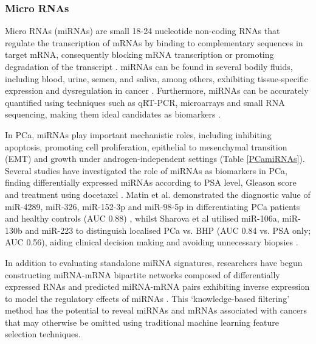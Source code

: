 \subsubsection{Micro RNAs}
Micro RNAs (miRNAs) are small 18-24 nucleotide non-coding RNAs that regulate the transcription of mRNAs by binding to complementary sequences in target mRNA, consequently blocking mRNA transcription or promoting degradation of the transcript \cite{Valencia-Sanchez2006Mar}. miRNAs can be found in several bodily fluids, including blood, urine, semen, and saliva, among others, exhibiting tissue-specific expression and dysregulation in cancer \cite{Weber2010Nov, Lin2015Jun}. Furthermore, miRNAs can be accurately quantified using techniques such as qRT-PCR, microarrays and small RNA sequencing, making them ideal candidates as biomarkers \cite{Fabris2016Aug}. \par
In PCa, miRNAs play important mechanistic roles, including inhibiting apoptosis, promoting cell proliferation, epithelial to mesenchymal transition (EMT) and growth under androgen-independent settings \cite{Bryant2012Feb} (Table \ref{PCamiRNAs}). Several studies have investigated the role of miRNAs as biomarkers in PCa, finding differentially expressed miRNAs according to PSA level, Gleason score and treatment using docetaxel \cite{Endzelins2017Nov, Mitchell2008Jul, Lin2014May}. Matin et al. demonstrated the diagnostic value of miR-4289, miR-326, miR-152-3p and miR-98-5p in differentiating PCa patients and healthy controls (AUC 0.88) \cite{Matin2018Apr}, whilst Sharova et al utilised miR-106a, miR-130b and miR-223 to distinguish localised PCa vs. BHP (AUC 0.84 vs. PSA only; AUC 0.56), aiding clinical decision making and avoiding unnecessary biopsies \cite{Sharova2016Jun}. \par
In addition to evaluating standalone miRNA signatures, researchers have begun constructing miRNA-mRNA bipartite networks composed of differentially expressed RNAs and predicted miRNA-mRNA pairs exhibiting inverse expression to model the regulatory effects of miRNAs \cite{Naghizadeh2023Jul, Lin2018Dec, Zhang2014Dec}. This `knowledge-based filtering' method has the potential to reveal miRNAs and mRNAs associated with cancers that may otherwise be omitted using traditional machine learning feature selection techniques. 


